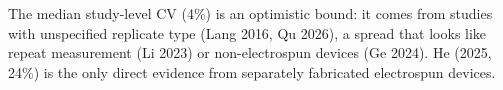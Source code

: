The median study-level CV (4\%) is an optimistic bound: it comes from studies with unspecified replicate type (Lang 2016, Qu 2026), a spread that looks like repeat measurement (Li 2023) or non-electrospun devices (Ge 2024). He (2025, 24\%) is the only direct evidence from separately fabricated electrospun devices.
